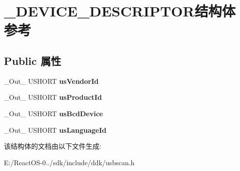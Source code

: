 \hypertarget{struct___d_e_v_i_c_e___d_e_s_c_r_i_p_t_o_r}{}\section{\+\_\+\+D\+E\+V\+I\+C\+E\+\_\+\+D\+E\+S\+C\+R\+I\+P\+T\+O\+R结构体 参考}
\label{struct___d_e_v_i_c_e___d_e_s_c_r_i_p_t_o_r}
\subsection*{Public 属性}
\begin{DoxyCompactItemize}
\item 
\mbox{\label{struct___d_e_v_i_c_e___d_e_s_c_r_i_p_t_o_r_a77a036ae13cdf4727de60674abec1312}} 
\+\_\+\+Out\+\_\+ U\+S\+H\+O\+RT {\bfseries us\+Vendor\+Id}
\item 
\mbox{\label{struct___d_e_v_i_c_e___d_e_s_c_r_i_p_t_o_r_af086aabee4bf252ec88590cf9b88c373}} 
\+\_\+\+Out\+\_\+ U\+S\+H\+O\+RT {\bfseries us\+Product\+Id}
\item 
\mbox{\label{struct___d_e_v_i_c_e___d_e_s_c_r_i_p_t_o_r_a09c41265633f5bcf2252b01c14c22b1f}} 
\+\_\+\+Out\+\_\+ U\+S\+H\+O\+RT {\bfseries us\+Bcd\+Device}
\item 
\mbox{\label{struct___d_e_v_i_c_e___d_e_s_c_r_i_p_t_o_r_a8e7dea5a31f94b59dd108b1962b87c2a}} 
\+\_\+\+Out\+\_\+ U\+S\+H\+O\+RT {\bfseries us\+Language\+Id}
\end{DoxyCompactItemize}


该结构体的文档由以下文件生成\+:\begin{DoxyCompactItemize}
\item 
E\+:/\+React\+O\+S-\/0../sdk/include/ddk/usbscan.\+h\end{DoxyCompactItemize}
